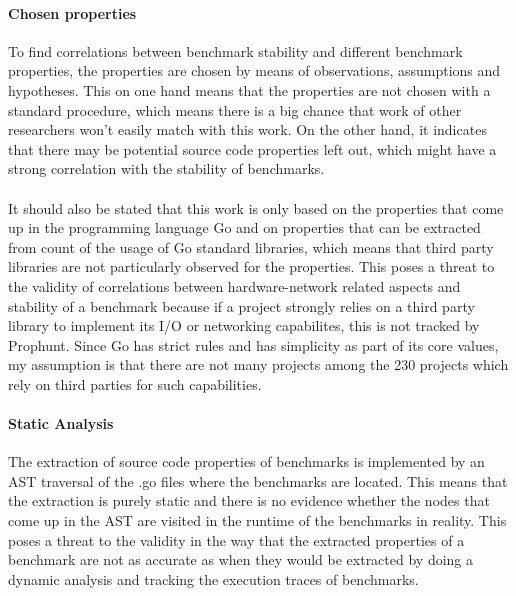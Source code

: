 \documentclass{seal_thesis}
\begin{document}
\paragraph{Chosen properties}
To find correlations between benchmark stability and different benchmark properties, the properties are chosen by means of observations, assumptions and hypotheses. This on one hand means that the properties are not chosen with a standard procedure, which means there is a big chance that work of other researchers won't easily match with this work. On the other hand, it indicates that there may be potential source code properties left out, which might have a strong correlation with the stability of benchmarks.\\
\\
It should also be stated that this work is only based on the properties that come up in the programming language Go and on properties that can be extracted from count of the usage of Go standard libraries, which means that third party libraries are not particularly observed for the properties. This poses a threat to the validity of correlations between hardware-network related aspects and stability of a benchmark because if a project strongly relies on a third party library to implement its I/O or networking capabilites, this is not tracked by Prophunt. Since Go has strict rules and has simplicity as part of its core values, my assumption is that there are not many projects among the 230 projects which rely on third parties for such capabilities.

\paragraph{Static Analysis}
The extraction of source code properties of benchmarks is implemented by an AST traversal of the .go files where the benchmarks are located. This means that the extraction is purely static and there is no evidence whether the nodes that come up in the AST are visited in the runtime of the benchmarks in reality. This poses a threat to the validity in the way that the extracted properties of a benchmark are not as accurate as when they would be extracted by doing a dynamic analysis and tracking the execution traces of benchmarks. 
\end{document}
